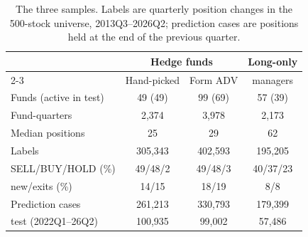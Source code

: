 \begin{table}[t]
  \caption{The three samples. Labels are quarterly position changes in the 500-stock universe,
  2013Q3--2026Q2; prediction cases are positions held at the end of the previous quarter.}
  \label{tab:summary}
  \small
  \setlength{\tabcolsep}{3pt}
  \begin{tabular}{@{}lccc@{}}
    \toprule
     & \multicolumn{2}{c}{Hedge funds} & Long-only \\ \cmidrule(lr){2-3}
     & Hand-picked & Form ADV & managers \\
    \midrule
    Funds (active in test) & 49 (49) & 99 (69) & 57 (39) \\
    Fund-quarters & 2,374 & 3,978 & 2,173 \\
    Median positions & 25 & 29 & 62 \\
    Labels & 305,343 & 402,593 & 195,205 \\
    \quad SELL/BUY/HOLD (\%) & 49/48/2 & 49/48/3 & 40/37/23 \\
    \quad new/exits (\%) & 14/15 & 18/19 & 8/8 \\
    Prediction cases & 261,213 & 330,793 & 179,399 \\
    \quad test (2022Q1--26Q2) & 100,935 & 99,002 & 57,486 \\
    \bottomrule
  \end{tabular}
\end{table}
